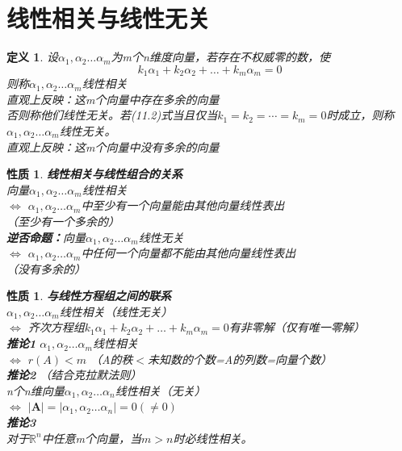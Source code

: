 \documentclass[12pt,oneside]{ctexbook}
\newtheorem{definition}[subsection]{定义}
\newtheorem{property}[subsection]{性质}
\begin{document}
\section{线性相关与线性无关}
\begin{definition}
    设\(\alpha_1,\alpha_2 \dots \alpha_m\)为m个n维度向量，若存在不权威零的数，使
    \[\tag{11.2} k_1\alpha_1 + k_2\alpha_2 + \dots + k_m\alpha_m = 0\]
    则称\(\alpha_1,\alpha_2 \dots \alpha_m\)线性相关
    \\直观上反映：这m个向量中存在多余的向量
    \\否则称他们线性无关。若(11.2)式当且仅当\(k_1=k_2=\cdots=k_m=0\)时成立，则称\(\alpha_1,\alpha_2 \dots \alpha_m\)线性无关。
    \\直观上反映：这m个向量中没有多余的向量
\end{definition}
\begin{property}
    \textbf{线性相关与线性组合的关系} \\
    向量\(\alpha_1,\alpha_2 \dots \alpha_m\)线性相关
    \\ \(\Leftrightarrow\) \(\alpha_1,\alpha_2 \dots \alpha_m\)中至少有一个向量能由其他向量线性表出
    \\（至少有一个多余的）
    \\\textbf{逆否命题：}向量\(\alpha_1,\alpha_2 \dots \alpha_m\)线性无关
    \\ \(\Leftrightarrow\) \(\alpha_1,\alpha_2 \dots \alpha_m\)中任何一个向量都不能由其他向量线性表出
    \\（没有多余的）
\end{property}
\begin{property}
    \textbf{与线性方程组之间的联系} \\
    \(\alpha_1,\alpha_2 \dots \alpha_m\)线性相关（线性无关）
    \\ \(\Leftrightarrow\) 齐次方程组\(k_1\alpha_1 + k_2\alpha_2 + \dots + k_m\alpha_m = 0\)有非零解（仅有唯一零解）
    \\ \textbf{推论1}
    \(\alpha_1,\alpha_2 \dots \alpha_m\)线性相关
    \\ \(\Leftrightarrow\) \(r(A)<m\) （A的秩\(<\)未知数的个数=A的列数=向量个数）
    \\ \textbf{推论2} （结合克拉默法则）
    \\n个n维向量\(\alpha_1,\alpha_2 \dots \alpha_n\)线性相关（无关）
    \\ \(\Leftrightarrow\) \(\rvert \mathbf{A} \rvert = \rvert \alpha_1,\alpha_2 \dots \alpha_n \rvert = 0 (\neq 0)\)
    \\ \textbf{推论3}
    \\ 对于\(\mathbb{R}^n\)中任意m个向量，当\(m > n\)时必线性相关。
\end{property}
\end{document}

